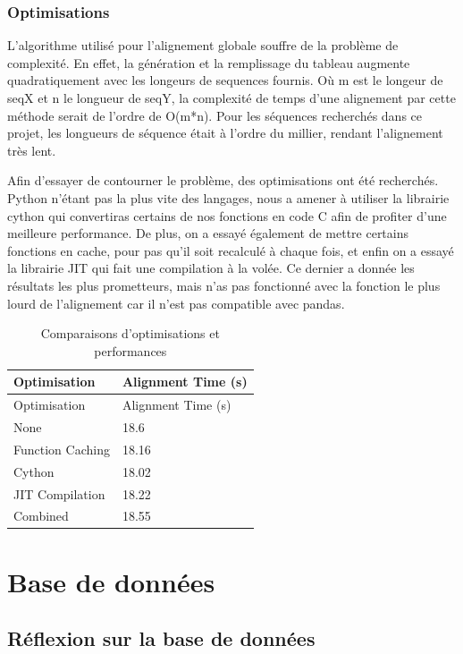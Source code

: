 \documentclass[11pt,french,]{article}
\begin{document}
\hypertarget{optimisations}{%
\subsubsection{Optimisations}\label{optimisations}}

L'algorithme utilisé pour l'alignement globale souffre de la problème de
complexité. En effet, la génération et la remplissage du tableau
augmente quadratiquement avec les longeurs de sequences fournis. Où m
est le longeur de seqX et n le longueur de seqY, la complexité de temps
d'une alignement par cette méthode serait de l'ordre de O(m*n). Pour les
séquences recherchés dans ce projet, les longueurs de séquence était à
l'ordre du millier, rendant l'alignement très lent.

Afin d'essayer de contourner le problème, des optimisations ont été
recherchés. Python n'étant pas la plus vite des langages, nous a amener
à utiliser la librairie cython qui convertiras certains de nos fonctions
en code C afin de profiter d'une meilleure performance. De plus, on a
essayé également de mettre certains fonctions en cache, pour pas qu'il
soit recalculé à chaque fois, et enfin on a essayé la librairie JIT qui
fait une compilation à la volée. Ce dernier a donnée les résultats les
plus prometteurs, mais n'as pas fonctionné avec la fonction le plus
lourd de l'alignement car il n'est pas compatible avec pandas.

\begin{longtable}[]{@{}ll@{}}
\caption{Comparaisons d'optimisations et performances}\tabularnewline
\toprule
Optimisation & Alignment Time (s)\tabularnewline
\midrule
\endfirsthead
\toprule
Optimisation & Alignment Time (s)\tabularnewline
\midrule
\endhead
None & 18.6\tabularnewline
Function Caching & 18.16\tabularnewline
Cython & 18.02\tabularnewline
JIT Compilation & 18.22\tabularnewline
Combined & 18.55\tabularnewline
\bottomrule
\end{longtable}

\hypertarget{base-de-donnees}{%
\section{Base de données}\label{base-de-donnees}}

\hypertarget{reflexion-sur-la-base-de-donnees}{%
\subsection{Réflexion sur la base de
données}\label{reflexion-sur-la-base-de-donnees}}
\end{document}
